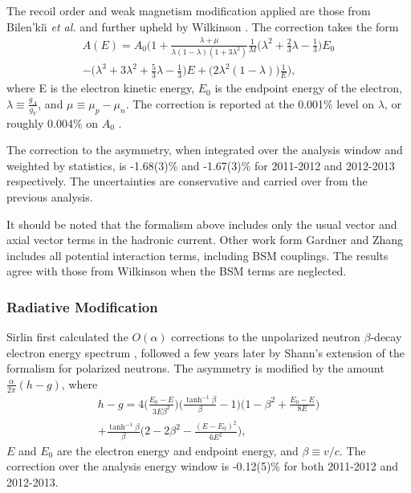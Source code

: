 The recoil order and weak magnetism modification
applied are those from Bilen'ki\u\i \textit{ et al.}
\cite{bilenkii1960} and further upheld by Wilkinson \cite{wilkinson1982}. 
The correction takes the form 
%
\begin{multline}
  A(E) = A_0 \bigg(1+ \frac{\lambda+\mu}{\lambda\left(1-\lambda\right)\left(1+3\lambda^2\right)}\frac{1}{M}
  \Big(\lambda^2+\frac{2}{3}\lambda-\frac{1}{3}\Big)E_0 \\
  -\Big(\lambda^3+3\lambda^2+\frac{5}{3}\lambda-\frac{1}{3}\Big)E
  +\Big(2\lambda^2\left(1-\lambda\right)\Big)\frac{1}{E}\bigg),
\end{multline}
%
\noindent where E is the electron kinetic energy, $E_0$ is
the endpoint energy of the electron, $\lambda\equiv\frac{g_A}{g_V}$,
and $\mu\equiv\mu_p-\mu_n$. The correction is reported at the 0.001\%
level on $\lambda$, or roughly 0.004\% on $A_0$ \cite{wilkinson1982}.

The correction to the asymmetry, when integrated over the analysis window
and weighted by statistics, is -1.68(3)\% and -1.67(3)\% for 2011-2012 and
2012-2013 respectively. The uncertainties are conservative and carried over
from the previous analysis.

It should be noted that the formalism above includes only the usual vector and
axial vector terms in the hadronic current. Other work form Gardner and Zhang
\cite{gardner2001} includes all potential interaction terms, including
BSM couplings. The results agree with those from Wilkinson when the BSM terms
are neglected.

\subsubsection{Radiative Modification}

Sirlin first calculated the $O(\alpha)$ corrections to the unpolarized neutron
$\beta$-decay electron energy spectrum \cite{sirlin1967}, followed a few years
later by Shann's extension of the formalism for polarized neutrons. The asymmetry is
modified by the amount $\frac{\alpha}{2\pi }(h-g)$, where
%
\begin{multline}
  h-g = 4 \bigg( \frac{E_0-E}{3E\beta^2} \bigg)
  \bigg( \frac{\tanh^{-1}\beta}{\beta}-1 \bigg)
  \bigg(1-\beta^2+ \frac{E_0-E}{8E} \bigg) \\
  + \frac{\tanh^{-1}\beta}{\beta}
  \bigg( 2-2\beta^2-\frac{\left(E-E_0\right)^2}{6E^2} \bigg),
\end{multline}
%
\noindent $E$ and $E_0$ are the electron energy and endpoint energy, and
$\beta\equiv v/c$. The correction over the analysis energy window
is -0.12(5)\% for both 2011-2012 and 2012-2013. 

